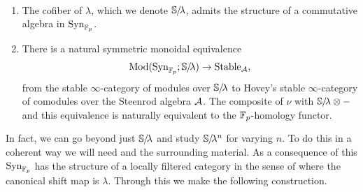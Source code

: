 \begin{thm} \label{thm:tau-inv}\ 

  \begin{enumerate}
  \item The cofiber of $\lambda$, which we denote $\operatorname{\mathbb{S}}\hspace{-2.2pt}/\!\lambda$, admits the structure of a commutative algebra in $\mathrm{Syn}_{\operatorname{\mathbb{F}}_p}$.
  \item There is a natural symmetric monoidal equivalence
    \[ \mathrm{Mod}(\mathrm{Syn}_{\operatorname{\mathbb{F}}_p}; \operatorname{\mathbb{S}}\hspace{-2.2pt}/\!\lambda) \to \mathrm{Stable}_{\operatorname{\mathcal{A}}}, \]
    from the stable $\infty$-category of modules over $\operatorname{\mathbb{S}}\hspace{-2.2pt}/\!\lambda$ to Hovey's stable $\infty$-category of comodules over the Steenrod algebra $\operatorname{\mathcal{A}}$.
    The composite of $\nu$ with $\operatorname{\mathbb{S}}\hspace{-2.2pt}/\!\lambda \otimes - $ and this equivalence is naturally equivalent to the $\operatorname{\mathbb{F}}_p$-homology functor.
  \end{enumerate}
\end{thm}


In fact, we can go beyond just $\operatorname{\mathbb{S}}\hspace{-2.2pt}/\!\lambda$ and study $\operatorname{\mathbb{S}}\hspace{-2.2pt}/\!\lambda^n$ for varying $n$.
To do this in a coherent way we will need \cite[Example C.15]{rmot} and the surrounding material.
As a consequence of this $\mathrm{Syn}_{\operatorname{\mathbb{F}}_p}$ has the structure of a locally filtered category in the sense of \cite{rotation}
where the canonical shift map is $\lambda$.
Through this we make the following construction. %

